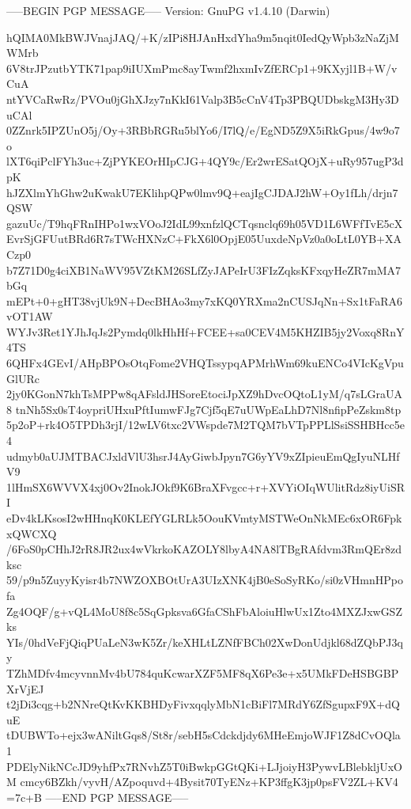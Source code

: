 -----BEGIN PGP MESSAGE-----
Version: GnuPG v1.4.10 (Darwin)

hQIMA0MkBWJVnajJAQ/+K/zIPi8HJAnHxdYha9m5nqit0IedQyWpb3zNaZjMWMrb
6V8trJPzutbYTK71pap9iIUXmPmc8ayTwmf2hxmIvZfERCp1+9KXyjl1B+W/vCuA
ntYVCaRwRz/PVOu0jGhXJzy7nKkI61Valp3B5cCnV4Tp3PBQUDbskgM3Hy3DuCAl
0ZZnrk5IPZUnO5j/Oy+3RBbRGRu5blYo6/I7lQ/e/EgND5Z9X5iRkGpus/4w9o7o
lXT6qiPclFYh3uc+ZjPYKEOrHIpCJG+4QY9c/Er2wrESatQOjX+uRy957ugP3dpK
hJZXlmYhGhw2uKwakU7EKlihpQPw0lmv9Q+eajIgCJDAJ2hW+Oy1fLh/drjn7QSW
gazuUc/T9hqFRnIHPo1wxVOoJ2IdL99xnfzlQCTqsnclq69h05VD1L6WFfTvE5cX
EvrSjGFUutBRd6R7sTWcHXNzC+FkX6l0OpjE05UuxdeNpVz0a0oLtL0YB+XACzp0
b7Z71D0g4ciXB1NaWV95VZtKM26SLfZyJAPeIrU3FIzZqksKFxqyHeZR7mMA7bGq
mEPt+0+gHT38vjUk9N+DecBHAo3my7xKQ0YRXma2nCUSJqNn+Sx1tFaRA6vOT1AW
WYJv3Ret1YJhJqJs2Pymdq0lkHhHf+FCEE+sa0CEV4M5KHZIB5jy2Voxq8RnY4TS
6QHFx4GEvI/AHpBPOsOtqFome2VHQTssypqAPMrhWm69kuENCo4VIcKgVpuGlURc
2jy0KGonN7khTsMPPw8qAFsldJHSoreEtociJpXZ9hDvcOQtoL1yM/q7sLGraUA8
tnNh5Sx0sT4oypriUHxuPftIumwFJg7Cjf5qE7uUWpEaLhD7Nl8nfipPeZskm8tp
5p2oP+rk4O5TPDh3rjI/12wLV6txc2VWspde7M2TQM7bVTpPPLlSsiSSHBHcc5e4
udmyb0aUJMTBACJxldVlU3hsrJ4AyGiwbJpyn7G6yYV9xZIpieuEmQgIyuNLHfV9
1lHmSX6WVVX4xj0Ov2InokJOkf9K6BraXFvgcc+r+XVYiOIqWUlitRdz8iyUiSRI
eDv4kLKsosI2wHHnqK0KLEfYGLRLk5OouKVmtyMSTWeOnNkMEc6xOR6FpkxQWCXQ
/6FoS0pCHhJ2rR8JR2ux4wVkrkoKAZOLY8lbyA4NA8lTBgRAfdvm3RmQEr8zdksc
59/p9n5ZuyyKyisr4b7NWZOXBOtUrA3UIzXNK4jB0eSoSyRKo/si0zVHmnHPpofa
Zg4OQF/g+vQL4MoU8f8c5SqGpksva6GfaCShFbAloiuHlwUx1Zto4MXZJxwGSZks
YIs/0hdVeFjQiqPUaLeN3wK5Zr/keXHLtLZNfFBCh02XwDonUdjkl68dZQbPJ3qy
TZhMDfv4mcyvnnMv4bU784quKcwarXZF5MF8qX6Pe3e+x5UMkFDeHSBGBPXrVjEJ
t2jDi3cqg+b2NNreQtKvKKBHDyFivxqqlyMbN1cBiFl7MRdY6ZfSgupxF9X+dQuE
tDUBWTo+ejx3wANiltGqs8/St8r/sebH5sCdckdjdy6MHeEmjoWJF1Z8dCvOQla1
PDElyNikNCcJD9yhfPx7RNvhZ5T0iBwkpGGtQKi+LJjoiyH3PywvLBlebkljUxOM
cmcy6BZkh/vyvH/AZpoquvd+4Bysit70TyENz+KP3ffgK3jp0psFV2ZL+KV4
=7c+B
-----END PGP MESSAGE-----
